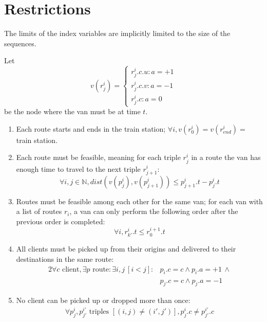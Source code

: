 \section{Restrictions}
The limits of the index variables are implicitly limited to the size of the sequences.\par
Let
\begin{equation*}
    v(r^i_j) =
    \begin{cases}
        r^i_j.c.u : a = +1\\
        r^i_j.c.v : a = -1\\
        r^i_j.c   : a = 0
    \end{cases}
\end{equation*}
be the node where the van must be at time $t$.
\begin{enumerate}
    \item Each route starts and ends in the train station; $\forall i, v(r^i_0) = v(r^i_{end}) = $ train station.
    \item Each route must be feasible, meaning for each triple $r^i_j$ in a route the van has enough time to travel to the next triple $r^i_{j+1}$:
    \begin{equation*}
        \forall i,j \in \mathbb{N}, dist(v(p^i_j), v(p^i_{j+1})) \leq p^i_{j+1}.t-p^i_j.t
    \end{equation*}
    \item Routes must be feasible among each other for the same van; for each van with a list of routes $r_i$, a van can only perform the following order after the previous order is completed:
    \begin{equation*}
        \forall i, r^i_{k'}.t \leq r^{i+1}_0.t
    \end{equation*}
    \item All clients must be picked up from their origins and delivered to their destinations in the same route:
    \begin{alignat*}{2}
        \forall c \text{ client}, \exists p \text{ route} \colon \exists i, j~[i<j] \colon
        & p_i.c = c \wedge p_i.a = +1\,\wedge \\
        & p_j.c = c \wedge p_j.a = -1
    \end{alignat*}
    \item No client can be picked up or dropped more than once:
    \begin{gather*}
        \forall p^i_j, p^{i'}_{j'} \text{ triples }[(i,j) \neq (i',j')], p^i_j.c \neq p^{i'}_{j'}.c
    \end{gather*}
\end{enumerate}
